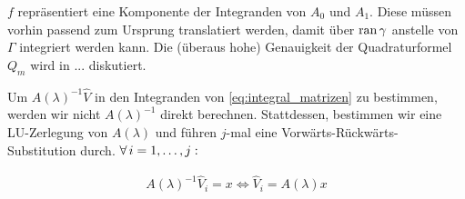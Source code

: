 $f$ repräsentiert eine Komponente der Integranden von $A_0$ und $A_1$.
Diese müssen vorhin passend zum Ursprung translatiert werden, damit über $\operatorname{ran} \gamma$ anstelle von $\Gamma$ integriert werden kann.
Die (überaus hohe) Genauigkeit der Quadraturformel $Q_m$ wird in ... diskutiert.

Um $A(\lambda)^{-1} \hat V$ in den Integranden von \eqref{eq:integral_matrizen} zu bestimmen, werden wir nicht $A(\lambda)^{-1}$ direkt berechnen.
Stattdessen, bestimmen wir eine LU-Zerlegung von $A(\lambda)$ und führen $j$-mal eine Vorwärts-Rückwärts-Substitution durch.
$\forall \, i = 1, \dots, j:$

\begin{align*}
    A(\lambda)^{-1} \hat V_i = x
    \iff
    \hat V_i = A(\lambda) x
\end{align*}
